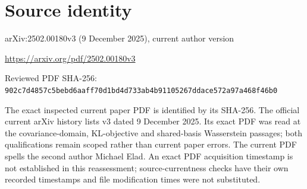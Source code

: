 \documentclass[11pt]{article}
\begin{document}
\section*{Source identity}

arXiv:2502.00180v3 (9 December 2025), current author version

\url{https://arxiv.org/pdf/2502.00180v3}

Reviewed PDF SHA-256: \nolinkurl{902c7d4857c5bebd6aaff70d1bd4d733ab4b91105267ddace572a97a468f46b0}

The exact inspected current paper PDF is identified by its SHA-256. The official current arXiv history lists v3 dated 9 December 2025. Its exact PDF was read at the covariance-domain, KL-objective and shared-basis Wasserstein passages; both qualifications remain scoped rather than current paper errors. The current PDF spells the second author Michael Elad. An exact PDF acquisition timestamp is not established in this reassessment; source-currentness checks have their own recorded timestamps and file modification times were not substituted.
\end{document}

